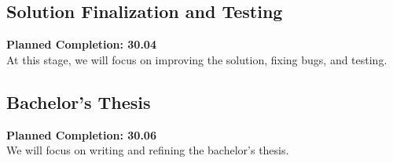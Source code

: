 \documentclass[12pt]{article}
\begin{document}
\subsection*{Solution Finalization and Testing}
\textbf{Planned Completion: 30.04}\\
At this stage, we will focus on improving the solution, fixing bugs, and testing.

\subsection*{Bachelor's Thesis}
\textbf{Planned Completion: 30.06}\\
We will focus on writing and refining the bachelor's thesis.



\end{document}
